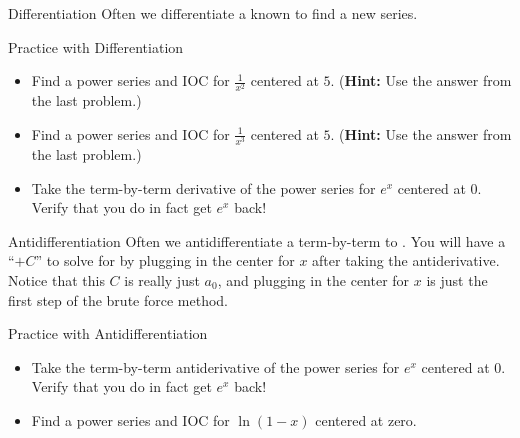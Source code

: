 \begin{subsection}{Differentiation}  Often we differentiate a known  to find a new series.
\begin{exercise}{Practice with Differentiation \Coffeecup \Coffeecup \Coffeecup}
\begin{itemize}
\item Find a power series and IOC for $\frac{1}{x^2}$ centered at $5$. ({\bf Hint:} Use the answer from the last problem.)
 
\vspace*{2in}

\item Find a power series and IOC for $\frac{1}{x^3}$ centered at $5$. ({\bf Hint:} Use the answer from the last problem.)

\vspace*{2in}

\item Take the term-by-term derivative of the power series for $e^x$ centered at 0.  Verify that you do in fact get $e^x$ back!

\vspace*{2in}

\end{itemize}
\end{exercise}
\end{subsection}

\begin{subsection}{Antidifferentiation} Often we antidifferentiate a  term-by-term to .  You will have a ``$+C$'' to solve for by plugging in the center for $x$ after taking the antiderivative.  Notice that this $C$ is really just $a_0$, and plugging in the center for $x$ is just the first step of the brute force method. 

\begin{exercise}{Practice with Antidifferentiation \Coffeecup \Coffeecup \Coffeecup}
\begin{itemize}
\item Take the term-by-term antiderivative of the power series for $e^x$ centered at 0.  Verify that you do in fact get $e^x$ back!

\vspace*{2in}

\item Find a power series and IOC for $\ln(1-x)$ centered at zero.

\vspace*{2in}

\end{itemize}
\end{exercise}
\end{subsection}

